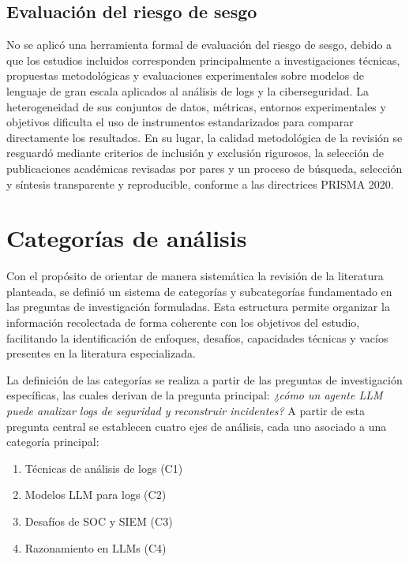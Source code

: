 \subsection{Evaluación del riesgo de sesgo}
No se aplicó una herramienta formal de evaluación del riesgo de sesgo, debido a que los estudios incluidos corresponden principalmente a investigaciones técnicas, propuestas metodológicas y evaluaciones experimentales sobre modelos de lenguaje de gran escala aplicados al análisis de logs y la ciberseguridad. La heterogeneidad de sus conjuntos de datos, métricas, entornos experimentales y objetivos dificulta el uso de instrumentos estandarizados para comparar directamente los resultados. En su lugar, la calidad metodológica de la revisión se resguardó mediante criterios de inclusión y exclusión rigurosos, la selección de publicaciones académicas revisadas por pares y un proceso de búsqueda, selección y síntesis transparente y reproducible, conforme a las directrices PRISMA 2020.


\section{Categorías de análisis}

Con el propósito de orientar de manera sistemática la revisión de la literatura planteada, se definió un sistema de categorías y subcategorías fundamentado en las preguntas de investigación formuladas. Esta estructura permite organizar la información recolectada de forma coherente con los objetivos del estudio, facilitando la identificación de enfoques, desafíos, capacidades técnicas y vacíos presentes en la literatura especializada.

La definición de las categorías se realiza a partir de las preguntas de investigación específicas, las cuales derivan de la pregunta principal: \textit{¿cómo un agente LLM puede analizar logs de seguridad y reconstruir incidentes?} A partir de esta pregunta central se establecen cuatro ejes de análisis, cada uno asociado a una categoría principal: 
\begin{itemize}
\begin{enumerate}
    \item Técnicas de análisis de logs (C1)
    \item Modelos LLM para logs (C2)
    \item Desafíos de SOC y SIEM (C3)
    \item Razonamiento en LLMs (C4)
\end{enumerate}
\end{itemize}


